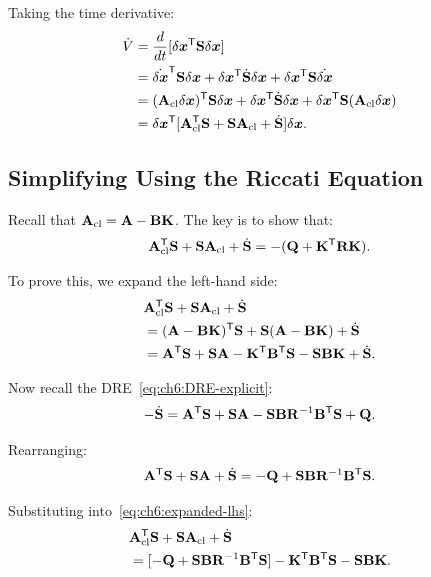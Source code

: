 Taking the time derivative:
\begin{align}
\dot{V} &= \frac{d}{dt}[\delta\bm{x}^{\mathsf{T}}\mathbf{S}\delta\bm{x}] \notag\\
&= \dot{\delta\bm{x}}^{\mathsf{T}}\mathbf{S}\delta\bm{x} + \delta\bm{x}^{\mathsf{T}}\dot{\mathbf{S}}\delta\bm{x} + \delta\bm{x}^{\mathsf{T}}\mathbf{S}\dot{\delta\bm{x}} \notag\\
&= (\mathbf{A}_{\text{cl}}\delta\bm{x})^{\mathsf{T}}\mathbf{S}\delta\bm{x} + \delta\bm{x}^{\mathsf{T}}\dot{\mathbf{S}}\delta\bm{x} + \delta\bm{x}^{\mathsf{T}}\mathbf{S}(\mathbf{A}_{\text{cl}}\delta\bm{x}) \notag\\
&= \delta\bm{x}^{\mathsf{T}}[\mathbf{A}_{\text{cl}}^{\mathsf{T}}\mathbf{S} + \mathbf{S}\mathbf{A}_{\text{cl}} + \dot{\mathbf{S}}]\delta\bm{x}.
\label{eq:ch6:V-derivative}
\end{align}

\subsection{Simplifying Using the Riccati Equation}

Recall that $\mathbf{A}_{\text{cl}} = \mathbf{A} - \mathbf{B}\mathbf{K}$. The key is to show that:
\begin{equation}
\mathbf{A}_{\text{cl}}^{\mathsf{T}}\mathbf{S} + \mathbf{S}\mathbf{A}_{\text{cl}} + \dot{\mathbf{S}} = -(\mathbf{Q} + \mathbf{K}^{\mathsf{T}}\mathbf{R}\mathbf{K}).
\label{eq:ch6:key-identity}
\end{equation}

To prove this, we expand the left-hand side:
\begin{align}
&\mathbf{A}_{\text{cl}}^{\mathsf{T}}\mathbf{S} + \mathbf{S}\mathbf{A}_{\text{cl}} + \dot{\mathbf{S}} \notag\\
&= (\mathbf{A} - \mathbf{B}\mathbf{K})^{\mathsf{T}}\mathbf{S} + \mathbf{S}(\mathbf{A} - \mathbf{B}\mathbf{K}) + \dot{\mathbf{S}} \notag\\
&= \mathbf{A}^{\mathsf{T}}\mathbf{S} + \mathbf{S}\mathbf{A} - \mathbf{K}^{\mathsf{T}}\mathbf{B}^{\mathsf{T}}\mathbf{S} - \mathbf{S}\mathbf{B}\mathbf{K} + \dot{\mathbf{S}}.
\label{eq:ch6:expanded-lhs}
\end{align}

Now recall the DRE~\eqref{eq:ch6:DRE-explicit}:
\begin{equation}
-\dot{\mathbf{S}} = \mathbf{A}^{\mathsf{T}}\mathbf{S} + \mathbf{S}\mathbf{A} - \mathbf{S}\mathbf{B}\mathbf{R}^{-1}\mathbf{B}^{\mathsf{T}}\mathbf{S} + \mathbf{Q}.
\label{eq:ch6:dre-rearrange}
\end{equation}

Rearranging:
\begin{equation}
\mathbf{A}^{\mathsf{T}}\mathbf{S} + \mathbf{S}\mathbf{A} + \dot{\mathbf{S}} = -\mathbf{Q} + \mathbf{S}\mathbf{B}\mathbf{R}^{-1}\mathbf{B}^{\mathsf{T}}\mathbf{S}.
\label{eq:ch6:dre-alt}
\end{equation}

Substituting into~\eqref{eq:ch6:expanded-lhs}:
\begin{align}
&\mathbf{A}_{\text{cl}}^{\mathsf{T}}\mathbf{S} + \mathbf{S}\mathbf{A}_{\text{cl}} + \dot{\mathbf{S}} \notag\\
&= [-\mathbf{Q} + \mathbf{S}\mathbf{B}\mathbf{R}^{-1}\mathbf{B}^{\mathsf{T}}\mathbf{S}] - \mathbf{K}^{\mathsf{T}}\mathbf{B}^{\mathsf{T}}\mathbf{S} - \mathbf{S}\mathbf{B}\mathbf{K}.
\label{eq:ch6:partial}
\end{align}

